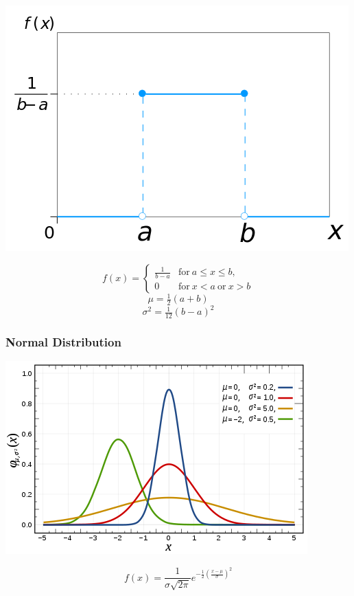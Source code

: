 \documentclass{article}
\begin{document}
\begin{center}
\includegraphics[scale=0.4]{./images/uniform_distribution.png}
\end{center}

\[
f(x) = 
\begin{cases}
\frac{1}{b-a} & \mathrm{for} \ a \leq x \leq b, \\
0 & \mathrm{for} \ x < a \ \mathrm{or} \ x > b
\end{cases}
\]
\[\mu = \tfrac{1}{2} (a + b)\]
\[\sigma^{2} = \tfrac{1}{12} (b - a)^{2}\]

\subsubsection{Normal Distribution}

\begin{center}
\includegraphics[scale=0.4]{./images/normal_distribution.png}
\end{center}

\[f(x) = \frac{1}{\sigma \sqrt{2\pi}} e^{-\frac{1}{2} (\frac{x - \mu}{\sigma })^{2}}\]

\printindex
\end{document}
